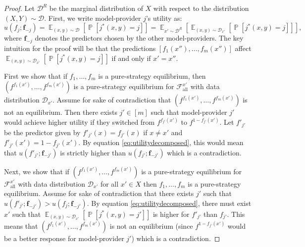 \documentclass[letterpaper,11pt]{article}
\theoremstyle{plain}
\DeclareMathOperator*{\E}{\mathbb{E}}
\DeclareMathOperator*{\Prob}{\mathbb{P}}
\begin{document}
\begin{proof}
Let $\mathcal{D}^R$ be the marginal distribution of $X$ with respect to the distribution $(X,Y) \sim \mathcal{D}$. First, we write model-provider $j$'s utility as:
\begin{equation}
\label{eq:utilitydecomposed}
  u(f_j; \mathbf{f}_{-j}) = \E_{(x,y) \sim \mathcal{D}} \left[\Prob[j^*(x,y) = j] \right] =  \E_{x' \sim \mathcal{D}^R} \left[\E_{(x,y) \sim \mathcal{D}_{x'}} \left[\Prob[j^*(x,y) = j] \right]\right],
\end{equation}
where $\textbf{f}_{-j}$ denotes the predictors chosen by the other model-providers. The key intuition for the proof will be that the predictions $[f_1(x''), \ldots, f_m(x'')]$ affect $\E_{(x,y) \sim \mathcal{D}_{x'}} \left[\Prob[j^*(x,y) = j] \right]$ if and only if $x' = x''$. 

First we show that if $f_1, \ldots, f_m$ is a pure-strategy equilibrium, then $(f^{f_1(x')}, \ldots, f^{f_m(x')})$ is a pure-strategy equilibrium for $\mathcal{F}_{\text{all}}^{x'}$ with data distribution $\mathcal{D}_{x'}$. Assume for sake of contradiction that $(f^{f_1(x')}, \ldots, f^{f_m(x')})$ is not an equilibrium. Then there exists $j' \in [m]$ such that model-provider $j'$ would achieve higher utility if they switched from $f^{f_{j'}(x')}$ to $f^{1-f_{j'}(x')}$. Let $f'_{j'}$ be the predictor given by $f'_{j'}(x) = f_{j'}(x)$ if $x \neq x'$ and $f'_{j'}(x') = 1 - f_{j'}(x')$. By equation \eqref{eq:utilitydecomposed}, this would mean that $u(f'_{j'}; \mathbf{f}_{-j'})$ is strictly higher than $u(f_{j'}; \mathbf{f}_{-j'})$ which is a contradiction.

Next, we show that if $(f^{f_1(x')}, \ldots, f^{f_m(x')})$ is a pure-strategy equilibrium for $\mathcal{F}_{\text{all}}^{x'}$ with data distribution $\mathcal{D}_{x'}$ for all $x' \in X$ then $f_1, \ldots, f_m$ is a pure-strategy equilibrium. Assume for sake of contradiction that there exists $j'$ such that $u(f'_{j'}; \mathbf{f}_{-j'}) > u(f_j; \mathbf{f}_{-j'})$. By equation \eqref{eq:utilitydecomposed}, there must exist $x'$ such that  $\E_{(x,y) \sim \mathcal{D}_{x'}} \left[\Prob[j^*(x,y) = j'] \right]$ is higher for $f'_{j'}$ than $f_{j'}$. This means that $(f^{f_1(x')}, \ldots, f^{f_m(x')})$ is not an equilibrium (since $f^{1-f_{j'}(x')}$ would be a better response for model-provider $j'$) which is a contradiction.  
\end{proof}
\end{document}
